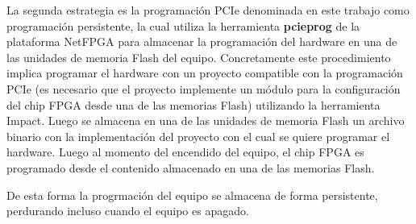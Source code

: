 La segunda estrategia es la programación PCIe denominada en este trabajo como programación persistente, la cual utiliza la herramienta \textbf{pcieprog} de la plataforma NetFPGA para almacenar la programaci\'on del hardware en una de las unidades de memoria Flash del equipo. Concretamente este procedimiento implica programar el hardware con un proyecto compatible con la programaci\'on PCIe (es necesario que el proyecto implemente un m\'odulo para la configuraci\'on del chip FPGA desde una de las memorias Flash) utilizando la herramienta Impact. Luego se almacena en una de las unidades de memoria Flash un archivo binario con la implementaci\'on del proyecto con el cual se quiere programar el hardware. Luego al momento del encendido del equipo, el chip FPGA es programado desde el contenido almacenado en una de las memorias Flash.

De esta forma la progrmaci\'on del equipo se almacena de forma persistente, perdurando incluso cuando el equipo es apagado.\\ 






